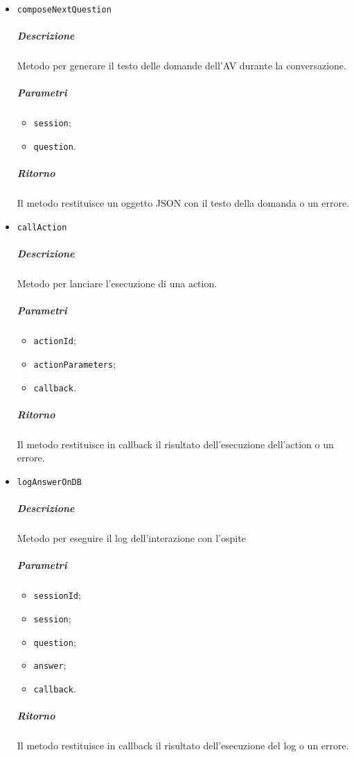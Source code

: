 \documentclass[../ManualeSviluppatore_v1.0.0.tex]{subfiles}
\begin{document}
\begin{itemize}
	\item \texttt{composeNextQuestion}
	      \subparagraph{Descrizione} Metodo per generare il testo delle domande dell'AV durante la conversazione.
	      \subparagraph{Parametri}
	      \begin{itemize}
	      	\item \texttt{session};
	      	\item \texttt{question}.
	      \end{itemize}
	      \subparagraph{Ritorno} Il metodo restituisce un oggetto JSON con il testo della domanda o un errore.

	\item \texttt{callAction}
	      \subparagraph{Descrizione} Metodo per lanciare l'esecuzione di una action.
	      \subparagraph{Parametri}
	      \begin{itemize}
	      	\item \texttt{actionId};
	      	\item \texttt{actionParameters};
	      	\item \texttt{callback}.
	      \end{itemize}
	      \subparagraph{Ritorno} Il metodo restituisce in callback il risultato dell'esecuzione dell'action o un errore.

	\item \texttt{logAnswerOnDB}
	      \subparagraph{Descrizione} Metodo per eseguire il log dell'interazione con l'ospite
	      \subparagraph{Parametri}
	      \begin{itemize}
	      	\item \texttt{sessionId};
	      	\item \texttt{session};
	      	\item \texttt{question};
	      	\item \texttt{answer};
	      	\item \texttt{callback}.
	      \end{itemize}
	      \subparagraph{Ritorno} Il metodo restituisce in callback il risultato dell'esecuzione del log o un errore.

\end{itemize}
\end{document}
